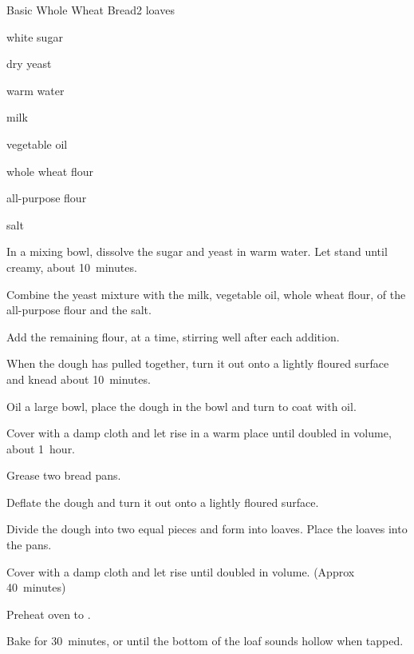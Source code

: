 \begin{recipe}{Basic Whole Wheat Bread}{}{2 loaves}

\begin{ingredients}
\item {} white sugar
\item {} dry yeast
\item \C{\threequarter} warm water
\item \C{\quarter} milk
\item {} vegetable oil
\item {} whole wheat flour
\item {} all-purpose flour
\item {} salt
\end{ingredients}

\begin{directions}
\item In a mixing bowl, dissolve the sugar and yeast in warm water. Let stand until creamy, about 10~minutes.
\item Combine the yeast mixture with the milk, vegetable oil, whole wheat flour,  of the all-purpose flour and the salt.
\item Add the remaining flour, \C{\half} at a time, stirring well after each addition.
\item When the dough has pulled together, turn it out onto a lightly floured surface and knead about 10~minutes.
\item Oil a large bowl, place the dough in the bowl and turn to coat with oil.
\item Cover with a damp cloth and let rise in a warm place until doubled in volume, about 1~hour.
\item Grease two bread pans.
\item Deflate the dough and turn it out onto a lightly floured surface.
\item Divide the dough into two equal pieces and form into loaves. Place the loaves into the pans.
\item Cover with a damp cloth and let rise until doubled in volume. (Approx 40~minutes)
\item Preheat oven to .
\item Bake for 30~minutes, or until the bottom of the loaf sounds hollow when tapped.
\end{directions}
\end{recipe}
